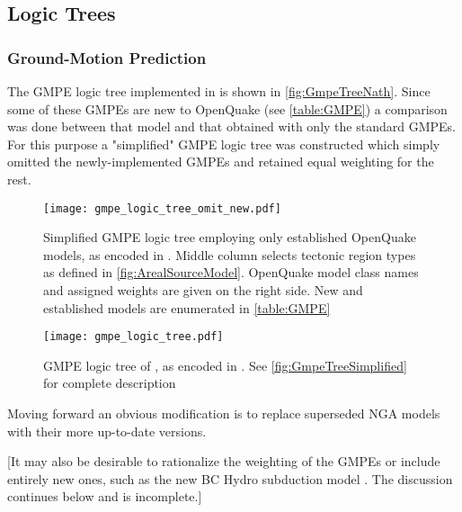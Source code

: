 \documentclass{article}
\begin{document}
\subsection{Logic Trees}
\label{subsec:LogicTrees}

\subsubsection{Ground-Motion Prediction}
\label{subsubsec:GmpeTree}

The GMPE logic tree implemented in \cite{nath2012probabilistic} is shown in \autoref{fig:GmpeTreeNath}. Since some of these GMPEs are new to OpenQuake (see \autoref{table:GMPE}) a comparison was done between that model and that obtained with only the standard GMPEs. For this purpose a "simplified" GMPE logic tree was constructed which simply omitted the newly-implemented GMPEs and retained equal weighting for the rest.

\begin{figure}[!htb]
\begin{adjustbox}{center}
\texttt{[image: gmpe\_logic\_tree\_omit\_new.pdf]}
\end{adjustbox}
\caption[Simplified GMPE logic tree]{Simplified GMPE logic tree employing only established OpenQuake models, as encoded in \texttt{}. Middle column selects tectonic region types as defined in \autoref{fig:ArealSourceModel}. OpenQuake model class names and assigned weights are given on the right side. New and established models are enumerated in \autoref{table:GMPE}}
\label{fig:GmpeTreeSimplified}
\end{figure}

\begin{figure}
\begin{adjustbox}{center}
\texttt{[image: gmpe\_logic\_tree.pdf]}
\end{adjustbox}
\caption[Original GMPE logic tree]{GMPE logic tree of \cite{nath2012probabilistic}, as encoded in \texttt{}. See \autoref{fig:GmpeTreeSimplified} for complete description}
\label{fig:GmpeTreeNath}
\end{figure}

Moving forward an obvious modification is to replace superseded NGA models with their more up-to-date versions. 

[It may also be desirable to rationalize the weighting of the GMPEs or include entirely new ones, such as the new BC Hydro subduction model \citep{abrahamson2012bc}. The discussion continues below and is incomplete.]
\end{document}
